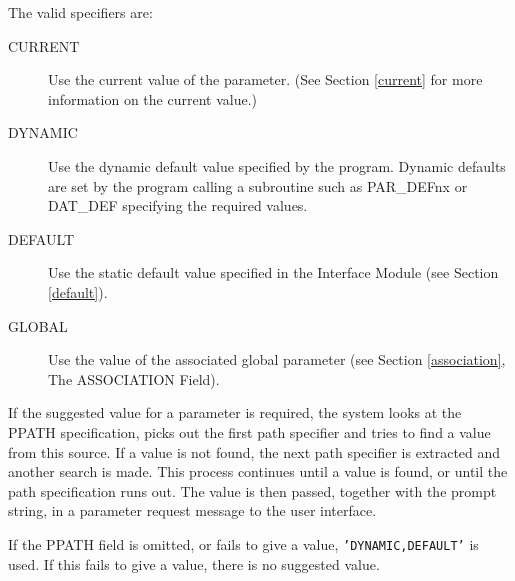\documentclass[twoside,11pt,nolof]{starlink}
\begin{document}
The valid specifiers are:
\begin{description}
\item[CURRENT] Use the current value of the parameter.
(See Section \ref{current} for more information on the current value.)
\item[DYNAMIC] Use the dynamic default value specified by the program.
Dynamic defaults are set by the program calling a subroutine such as
PAR\_DEFnx or DAT\_DEF specifying the required values.
\item[DEFAULT] Use the static default value specified in the Interface Module
(see Section \ref{default}).
\item[GLOBAL] Use the value of the associated global parameter (see Section
\ref{association}, The ASSOCIATION Field).
\end{description}
If the suggested value for a parameter is required, the system looks at the
PPATH specification, picks out the first path specifier and tries to
find a value from this source. If a value is not found, the next path
specifier is extracted and another search is made. This process
continues until a value is found, or until the path specification runs
out.
The value is then passed, together with the prompt string,
in a parameter request message to the user interface.

If the PPATH field is omitted, or fails to give a value,
\texttt{'DYNAMIC,DEFAULT'} is used.
If this fails to give a value, there is no suggested value.
\end{document}
